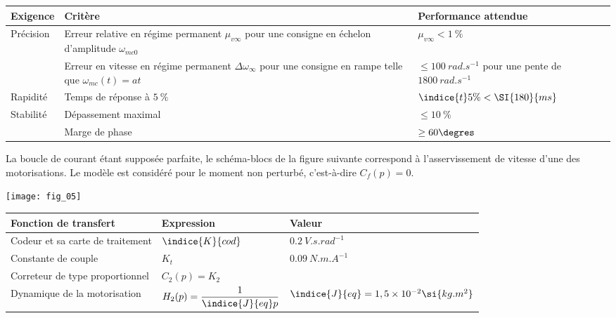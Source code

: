 \footnotesize
\begin{table*}
\begin{tabular}{lp{11cm}p{4cm}}
\hline
\textbf{Exigence} & \textbf{Critère} & \textbf{Performance attendue} \\
\hline
\multirow{2}{*}{Précision} & 
Erreur relative en régime permanent $\mu_{v\infty}$ pour une consigne en échelon d'amplitude $\omega_{mc0}$ & $\mu_{v\infty} < \SI{1}{\%}$ \\
& Erreur en vitesse en régime permanent $\Delta \omega_{\infty}$ pour une consigne en rampe telle que $\omega_{mc}(t)  = at$ & $\leq \SI{100}{rad.s^{-1}}$ pour une pente de $\SI{1800}{rad.s^{-1}}$ \\
Rapidité & Temps de réponse à $\SI{5}{\%}$ & $\indice{t}{5\%} < \SI{180}{ms}$ \\
\multirow{2}{*}{Stabilité} & Dépassement maximal & $\leq \SI{10}{\%}$  \\
& Marge de phase & $\geq 60\degres$  \\
\hline
\end{tabular}
\end{table*}

\normalsize


La boucle de courant étant supposée parfaite, le schéma-blocs de la figure suivante correspond à l’asservissement de
vitesse d’une des motorisations. Le modèle est considéré pour le moment non perturbé, c’est-à-dire $C_f(p)=0$.

\begin{center}
\texttt{[image: fig\_05]}
\end{center}


\begin{center}
\begin{tabular}{lll}
\hline
\textbf{Fonction de transfert} & \textbf{Expression} & \textbf{Valeur} \\
\hline
Codeur et sa carte de traitement & $\indice{K}{cod}$ & $\SI{0,2}{V.s.rad^{-1}}$ \\
Constante de couple & $K_t$ & $\SI{0,09}{N.m.A^{-1}}$ \\
Correteur de type proportionnel & $C_2(p) = K_2 $ &  \\
Dynamique de la motorisation & $H_2(p)=\dfrac{1}{\indice{J}{eq}p}$ & $\indice{J}{eq} = 1,5\times 10^{-2} \si{kg.m^2}$ \\
\hline
\end{tabular}
\end{center}

\ifprof
\begin{corrige}
\end{corrige}
\else
\fi

